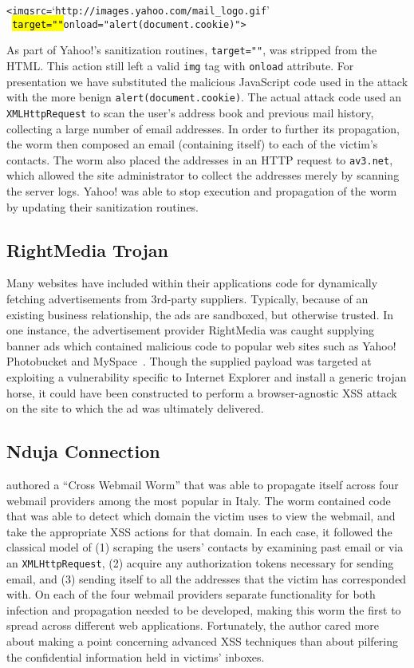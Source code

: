 \documentclass{acmtrans2m}
\begin{document}
\begin{alltt}
{<img src=`http://images.yahoo.com/mail_logo.gif'
\ \hl{target=""}onload="alert(document.cookie)">}
\end{alltt}

As part of Yahoo!'s sanitization routines, \texttt{target=""}, was stripped from the HTML.
This action still left a valid \texttt{img} tag with \texttt{onload} attribute.
For presentation we have substituted the malicious JavaScript code used in the attack with the more benign \texttt{alert(document.cookie)}.
The actual attack code used an \texttt{XMLHttpRequest} to scan the user's address book and previous mail history, collecting a large number of email addresses.
In order to further its propagation, the worm then composed an email (containing itself) to each of the victim's contacts.
The worm also placed the addresses in an HTTP request to \texttt{av3.net}, which allowed the site administrator to collect the addresses merely by scanning the server logs.
Yahoo! was able to stop execution and propagation of the worm by updating their sanitization routines.

\subsection{RightMedia Trojan}\label{sec:advertisement}
Many websites have included within their applications code for dynamically fetching advertisements from 3rd-party suppliers.
Typically, because of an existing business relationship, the ads are sandboxed, but otherwise trusted.
In one instance, the advertisement provider RightMedia was caught supplying banner ads which contained malicious code to popular web sites such as Yahoo! Photobucket and MySpace~\cite{adjacking}.
Though the supplied payload was targeted at exploiting a vulnerability specific to Internet Explorer and install a generic trojan horse, it could have been constructed to perform a browser-agnostic XSS attack on the site to which the ad was ultimately delivered.

\subsection{Nduja Connection}
 authored a ``Cross Webmail Worm'' that was able to propagate itself across four webmail providers among the most popular in Italy.
The worm contained code that was able to detect which domain the victim uses to view the webmail, and take the appropriate XSS actions for that domain.
In each case, it followed the classical model of (1) scraping the users' contacts by examining past email or via an \texttt{XMLHttpRequest}, (2) acquire any authorization tokens necessary for sending email, and (3) sending itself to all the addresses that the victim has corresponded with.
On each of the four webmail providers separate functionality for both infection and propagation needed to be developed, making this worm the first to spread across different web applications.
Fortunately, the author cared more about making a point concerning advanced XSS techniques than about pilfering the confidential information held in victims' inboxes.
\end{document}
